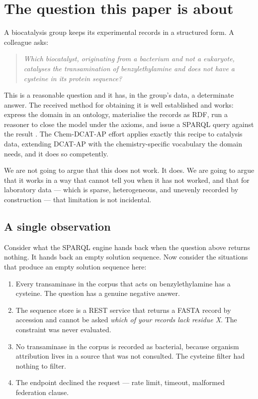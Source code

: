 \documentclass[11pt,a4paper]{article}
\theoremstyle{plain}
\theoremstyle{definition}
\theoremstyle{remark}
\begin{document}
\tableofcontents

\section{The question this paper is about}
\label{sec:intro}

A biocatalysis group keeps its experimental records in a structured
form. A colleague asks:

\begin{quote}
\emph{Which biocatalyst, originating from a bacterium and not a
eukaryote, catalyses the transamination of benzylethylamine and does not
have a cysteine in its protein sequence?}
\end{quote}

This is a reasonable question and it has, in the group's data, a
determinate answer. The received method for obtaining it is well
established and works: express the domain in an ontology, materialise
the records as RDF, run a reasoner to close the model under the
axioms, and issue a SPARQL query against the result
\citep{Baader2003,Grau2008,Harris2013}. The Chem-DCAT-AP effort applies
exactly this recipe to catalysis data, extending DCAT-AP
\citep{DCATAP2015,DCAT2020} with the chemistry-specific vocabulary the
domain needs, and it does so competently.

We are not going to argue that this does not work. It does. We are
going to argue that it works in a way that cannot tell you when it has
not worked, and that for laboratory data --- which is sparse,
heterogeneous, and unevenly recorded by construction --- that
limitation is not incidental.

\subsection{A single observation}

Consider what the SPARQL engine hands back when the question above
returns nothing. It hands back an empty solution sequence. Now consider
the situations that produce an empty solution sequence here:

\begin{enumerate}[label=(\alph*),leftmargin=2.2em]
\item Every transaminase in the corpus that acts on benzylethylamine has
  a cysteine. The question has a genuine negative answer.
\item The sequence store is a REST service that returns a FASTA record
  by accession and cannot be asked \emph{which of your records lack
  residue X}. The constraint was never evaluated.
\item No transaminase in the corpus is recorded as bacterial, because
  organism attribution lives in a source that was not consulted. The
  cysteine filter had nothing to filter.
\item The endpoint declined the request --- rate limit, timeout,
  malformed federation clause.
\end{enumerate}
\end{document}
